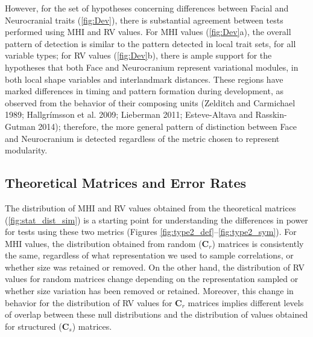 \documentclass[12pt,]{article}
\begin{document}
However, for the set of hypotheses concerning differences between Facial
and Neurocranial traits (\autoref{fig:Dev}), there is substantial
agreement between tests performed using MHI and RV values. For MHI
values (\autoref{fig:Dev}a), the overall pattern of detection is similar
to the pattern detected in local trait sets, for all variable types; for
RV values (\autoref{fig:Dev}b), there is ample support for the
hypotheses that both Face and Neurocranium represent variational
modules, in both local shape variables and interlandmark distances.
These regions have marked differences in timing and pattern formation
during development, as observed from the behavior of their composing
units (Zelditch and Carmichael 1989; Hallgrímsson et al. 2009; Lieberman
2011; Esteve-Altava and Rasskin-Gutman 2014); therefore, the more
general pattern of distinction between Face and Neurocranium is detected
regardless of the metric chosen to represent modularity.

\subsection{Theoretical Matrices and Error
Rates}\label{theoretical-matrices-and-error-rates}

The distribution of MHI and RV values obtained from the theoretical
matrices (\autoref{fig:stat_dist_sim}) is a starting point for
understanding the differences in power for tests using these two metrics
(Figures \ref{fig:type2_def}--\ref{fig:type2_sym}). For MHI values, the
distribution obtained from random ($\mathbf{C}_r$) matrices is
consistently the same, regardless of what representation we used to
sample correlations, or whether size was retained or removed. On the
other hand, the distribution of RV values for random matrices change
depending on the representation sampled or whether size variation has
been removed or retained. Moreover, this change in behavior for the
distribution of RV values for $\mathbf{C}_r$ matrices implies different
levels of overlap between these null distributions and the distribution
of values obtained for structured ($\mathbf{C}_s$) matrices.
\end{document}
